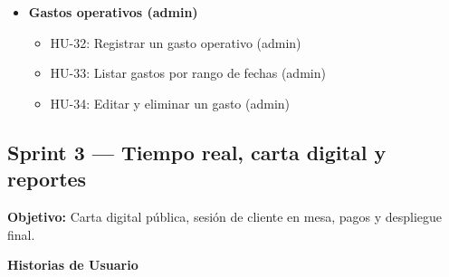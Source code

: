 \begin{itemize}[leftmargin=1.5em]
\item \textbf{Gastos operativos (admin)}

\begin{itemize}
\item HU-32: Registrar un gasto operativo (admin)
\item HU-33: Listar gastos por rango de fechas (admin)
\item HU-34: Editar y eliminar un gasto (admin)
\end{itemize}

\end{itemize}


\subsection*{Sprint 3 — Tiempo real, carta digital y reportes}

\textbf{Objetivo:}  
Carta digital pública, sesión de cliente en mesa, pagos y despliegue final.

\textbf{Historias de Usuario}

